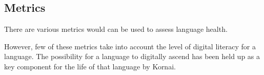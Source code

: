 \documentclass[10pt, a4paper]{article}
\begin{document}
\subsection{Metrics}

There are various metrics would can be used to assess language health. 



However, few of these metrics take into account the level of digital literacy for a language. The possibility for a language to digitally ascend has been held up as a key component for the life of that language by Kornai. %


\end{document}
